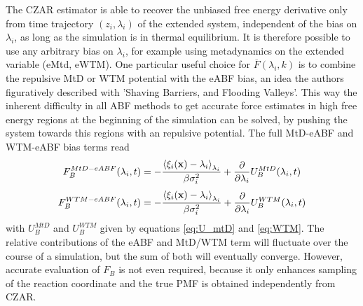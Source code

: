 The CZAR estimator is able to recover the unbiased free energy derivative only from time trajectory $(z_i,\lambda_i)$ of the extended system, independent of the bias on $\lambda_i$, as long as the simulation is in thermal equilibrium. It is therefore possible to use any arbitrary bias on $\lambda_i$, for example using metadynamics on the extended variable (eMtd, eWTM).
One particular useful choice for $\overline{F}(\lambda_{i}, k)$ is to combine the repulsive MtD or WTM potential with the eABF bias, an idea the authors figuratively described with 'Shaving Barriers, and Flooding Valleys'.\autocite{fu2018zooming}
This way the inherent difficulty in all ABF methods to get accurate force estimates in high free energy regions at the beginning of the simulation can be solved, by pushing the system towards this regions with an repulsive potential.
The full MtD-eABF and WTM-eABF bias terms read
\begin{equation}
  F_{B}^{MtD-eABF}(\lambda_i, t) = -\frac{\braket{\xi_i(\textbf{x})-\lambda_i}_{\lambda_i}}{\beta \sigma_i^2}+\frac{\partial}{\partial \lambda_i} U_{B}^{MtD}(\lambda_i,t)
\end{equation}
\begin{equation}
  F_{B}^{WTM-eABF}(\lambda_i, t) = -\frac{\braket{\xi_i(\textbf{x})-\lambda_i}_{\lambda_i}}{\beta \sigma_i^2}+\frac{\partial}{\partial \lambda_i} U_{B}^{WTM}(\lambda_i,t)
\end{equation}
with $U_{B}^{MtD}$ and $U_{B}^{WTM}$ given by equations \ref{eq:U_mtD} and \ref{eq:WTM}.
The relative contributions of the eABF and MtD/WTM term will fluctuate over the course of a simulation, but the sum of both will eventually converge. However, accurate evaluation of $F_B$ is not even required, because it only enhances sampling of the reaction coordinate and the true PMF is obtained independently from CZAR.

